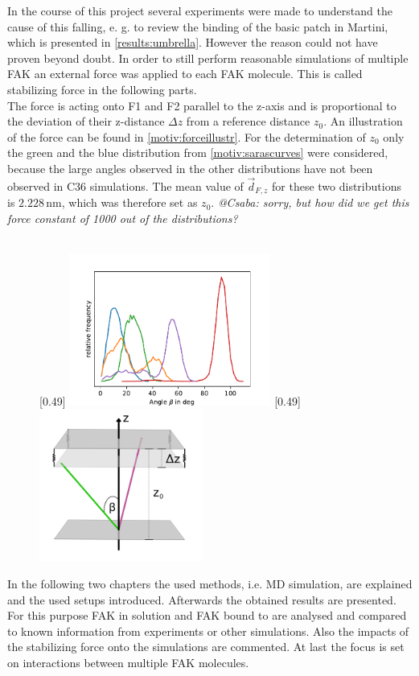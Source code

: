 In the course of this project several experiments were made to understand the cause of this falling, e. g. to review the binding of the basic patch in Martini, which is presented in \autoref{results:umbrella}. However the reason could not have proven beyond doubt. In order to still perform reasonable simulations of multiple FAK an external force was applied to each FAK molecule. This is called stabilizing force in the following parts.\\
The force is acting onto F1 and F2 parallel to the z-axis and is proportional to the deviation of their z-distance $\Delta z$ from a reference distance $z_0$. An illustration of the force can be found in \autoref{motiv:forceillustr}. For the determination of $z_0$ only the green and the blue distribution from \autoref{motiv:sarascurves} were considered, because the large angles observed in the other distributions have not been observed in C36 simulations. The mean value of $\vec{d}_{F, z}$ for these two distributions is $2.228\,\si{\nano\metre}$, which was therefore set as $z_0$. %
\textit{@Csaba: sorry, but how did we get this force constant of 1000 out of the distributions?}\\
\\
%
%
%
\begin{figure}
	\subcaptionbox{\label{motiv:sarascurves}}[0.49\textwidth]{
		\includegraphics[height=5cm]{figures/introduction/sara_angles}
	}\hfill%
	\subcaptionbox{\label{motiv:forceillustr}}[0.49\textwidth]{
		\includegraphics[height=5cm]{figures/introduction/forceapproach}
	}%
\end{figure}
%
%
%
In the following two chapters the used methods, i.e. MD simulation, are explained and the used setups introduced. Afterwards the obtained results are presented. For this purpose FAK in solution and FAK bound to \pip{} are analysed and compared to known information from experiments or other simulations. Also the impacts of the stabilizing force onto the simulations are commented. At last the focus is set on interactions between multiple FAK molecules.

